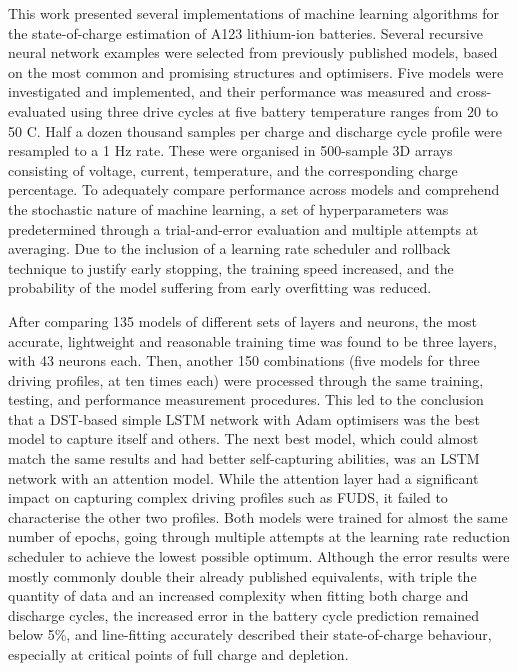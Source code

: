 
%
%
This work presented several implementations of machine learning algorithms for the state-of-charge estimation of A123 lithium-ion batteries.
Several recursive neural network examples were selected from previously published models, based on the most common and promising structures and optimisers.
Five models were investigated and implemented, and their performance was measured and cross-evaluated using three drive cycles at five battery temperature ranges  from 20 to 50 \textdegree{}C.
Half a dozen thousand samples per charge and discharge cycle profile were resampled to a 1 Hz rate.
These were organised in 500-sample 3D arrays consisting of voltage, current, temperature, and the corresponding charge percentage.
To adequately compare performance across models and comprehend the stochastic nature of machine learning, a set of hyperparameters was predetermined through a trial-and-error evaluation and multiple attempts at averaging.
Due to the inclusion of a learning rate scheduler and rollback technique to justify early stopping, the training speed increased, and the probability of the model suffering from early overfitting was reduced.

%
%
After comparing 135 models of different sets of layers and neurons, the most accurate, lightweight and reasonable training time was found to be three layers, with 43 neurons each.
Then, another 150 combinations (five models for three driving profiles, at ten times each) were processed through the same training, testing, and performance measurement procedures. This led to the conclusion that a DST-based simple LSTM network with Adam optimisers was the best model to capture itself and others.
The next best model, which could almost match the same results and had better self-capturing abilities, was an LSTM network with an attention model.
While the attention layer had a significant impact on capturing complex driving profiles such as FUDS, it failed to characterise the other two profiles.
Both models were trained for almost the same number of epochs, going through multiple attempts at the learning rate reduction scheduler to achieve the lowest possible optimum.
Although the error results were mostly commonly double their already published equivalents, with triple the quantity of data and an increased complexity when fitting both charge and discharge cycles, the increased error in the battery cycle prediction remained below 5\%, and line-fitting accurately described their state-of-charge behaviour, especially at critical points of full charge and depletion.

